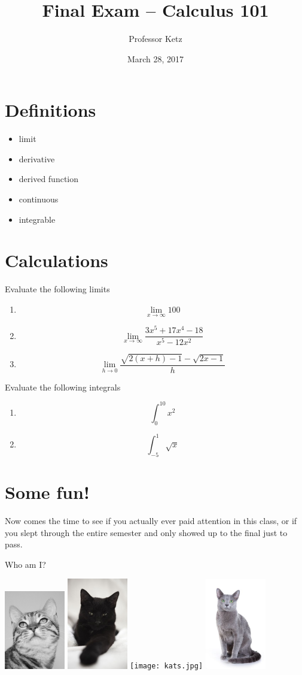 \documentclass{article}
\title{Final Exam -- Calculus 101}
\author{Professor Ketz}
\date{March 28, 2017}
\begin{document}
\maketitle

\section{Definitions}
	\begin{itemize}
	\item{limit}
	\item{derivative}
	\item{derived function}
	\item{continuous}
	\item{integrable}
	\end{itemize}

\section{Calculations}
Evaluate the following limits
	\begin{enumerate}
	\item{ \[\lim_{x\to\infty} 100\] }
	\item{ \[\lim_{x\to\infty} \frac{3x^5 + 17x^4 - 18}{x^5 - 12x^2}\] }
	\item{ \[\lim_{h\to0}\frac{\sqrt{2(x+h)-1}-\sqrt{2x-1}}{h}\] }
	\end{enumerate}
Evaluate the following integrals
	\begin{enumerate}
	\item{ \[ \int_{0}^{10} x^2 \] }
	\item{ \[ \int_{-5}^{1} \sqrt{x} \] }
	\end{enumerate}

\section{Some fun!}
Now comes the time to see if you actually ever paid attention in this class, or if you slept through the entire semester and only showed up to the final just to pass.

\begin{center}
Who am I?
\end{center}
\includegraphics[width=100px]{cat.jpg}
\includegraphics[width=100px]{cat2.jpg}
\texttt{[image: kats.jpg]}
\includegraphics[width=100px]{cat3.jpg}
\end{document}
